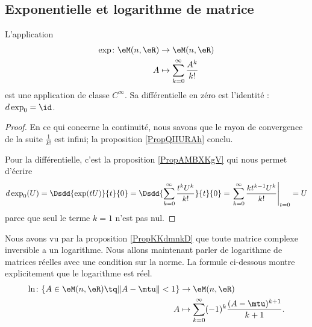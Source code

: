 \subsection{Exponentielle et logarithme de matrice}
\label{subsecXNcaQfZ}

\begin{proposition} \label{PropXFfOiOb}
    L'application
    \begin{equation}
        \begin{aligned}
            \exp\colon \eM(n,\eR)&\to \eM(n,\eR) \\
            A&\mapsto \sum_{k=0}^{\infty}\frac{ A^k }{ k! } 
        \end{aligned}
    \end{equation}
    est une application de classe \(  C^{\infty}\). Sa différentielle en zéro est l'identité : \( d\exp_0=\id\).
\end{proposition}

\begin{proof}
    En ce qui concerne la continuité, nous savons que le rayon de convergence de la suite \( \frac{1}{ k! }\) est infini; la proposition \ref{PropQIIURAh} conclu.

    Pour la différentielle, c'est la proposition \ref{PropAMBXKgV} qui nous permet d'écrire
    \begin{equation}
        d\exp_0(U)=\Dsdd{ \exp(tU) }{t}{0}=\Dsdd{ \sum_{k=0}^{\infty}\frac{ t^kU^k }{ k! } }{t}{0}=\left. \sum_{k=0}^{\infty}\frac{ kt^{k-1}U^k }{ k! }\right|_{t=0}=U
    \end{equation}
    parce que seul le terme \( k=1\) n'est pas nul.
\end{proof}

Nous avons vu par la proposition \ref{PropKKdmnkD} que toute matrice complexe inversible a un logarithme. Nous allons maintenant parler de logarithme de matrices réelles avec une condition sur la norme. La formule ci-dessous montre explicitement que le logarithme est réel.
\begin{equation}
    \begin{aligned}
        \ln\colon \{ A\in \eM(n,\eR)\tq \| A-\mtu \| <1 \}&\to \eM(n,\eR) \\
        A&\mapsto \sum_{k=0}^{\infty}(-1)^k\frac{ (A-\mtu)^{k+1} }{ k+1 }. 
    \end{aligned}
\end{equation}

